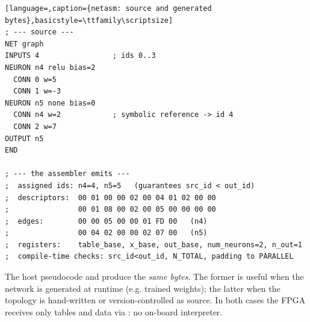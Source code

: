 \begin{lstlisting}[language=,caption={netasm: source and generated bytes},basicstyle=\ttfamily\scriptsize]
; --- source ---
NET graph
INPUTS 4                 ; ids 0..3
NEURON n4 relu bias=2
  CONN 0 w=5
  CONN 1 w=-3
NEURON n5 none bias=0
  CONN n4 w=2            ; symbolic reference -> id 4
  CONN 2 w=7
OUTPUT n5
END

; --- the assembler emits ---
;  assigned ids: n4=4, n5=5   (guarantees src_id < out_id)
;  descriptors:  00 01 00 00 02 00 04 01 02 00 00
;                00 01 08 00 02 00 05 00 00 00 00
;  edges:        00 00 05 00 00 01 FD 00   (n4)
;                00 04 02 00 00 02 07 00   (n5)
;  registers:    table_base, x_base, out_base, num_neurons=2, n_out=1
;  compile-time checks: src_id<out_id, N_TOTAL, padding to PARALLEL
\end{lstlisting}

\begin{fnnote}
The host pseudocode and  produce the \emph{same bytes}. The former is useful
when the network is generated at runtime (e.g. trained weights); the latter when the
topology is hand-written or version-controlled as source. In both cases the FPGA receives
only tables and data via : no on-board interpreter.
\end{fnnote}
